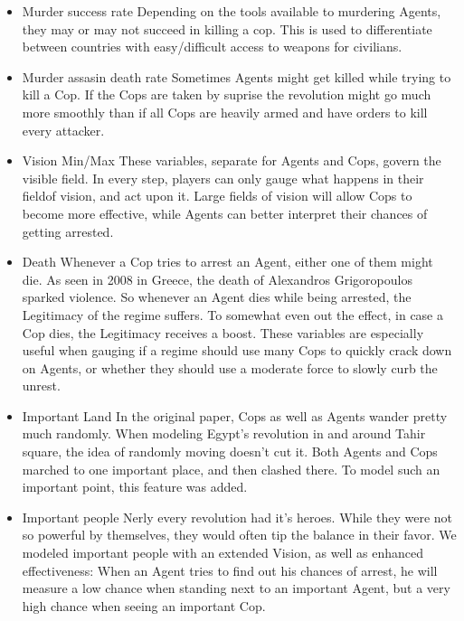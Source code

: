 \documentclass[11pt]{article}
\begin{document}
\begin{itemize}
\item Murder success rate\newline
Depending on the tools available to murdering Agents, they may or may not succeed in killing a cop. This is used to differentiate between countries with easy/difficult access to weapons for civilians.
\item Murder assasin death rate\newline
Sometimes Agents might get killed while trying to kill a Cop. If the Cops are taken by suprise the revolution might go much more smoothly than if all Cops are heavily armed and have orders to kill every attacker.

\item Vision Min/Max\newline
These variables, separate for Agents and Cops, govern the visible field. In every step, players can only gauge what happens in their fieldof vision, and act upon it. Large fields of vision will allow Cops to become more effective, while Agents can better interpret their chances of getting arrested.

\item Death\newline
Whenever a Cop tries to arrest an Agent, either one of them might die. As seen in 2008 in Greece, the death of Alexandros Grigoropoulos sparked violence. So whenever an Agent dies while being arrested, the Legitimacy of the regime suffers. To somewhat even out the effect, in case a Cop dies, the Legitimacy receives a boost. These variables are especially useful when gauging if a regime should use many Cops to quickly crack down on Agents, or whether they should use a moderate force to slowly curb the unrest.

\item Important Land\newline
In the original paper, Cops as well as Agents wander pretty much randomly. When modeling Egypt's revolution in and around Tahir square, the idea of randomly moving doesn't cut it. Both Agents and Cops marched to one important place, and then clashed there. To model such an important point, this feature was added.

\item Important people\newline
Nerly every revolution had it's heroes. While they were not so powerful by themselves, they would often tip the balance in their favor. We modeled important people with an extended Vision, as well as enhanced effectiveness: When an Agent tries to find out his chances of arrest, he will measure a low chance when standing next to an important Agent, but a very high chance when seeing an important Cop.


\end{itemize}
\end{document}
